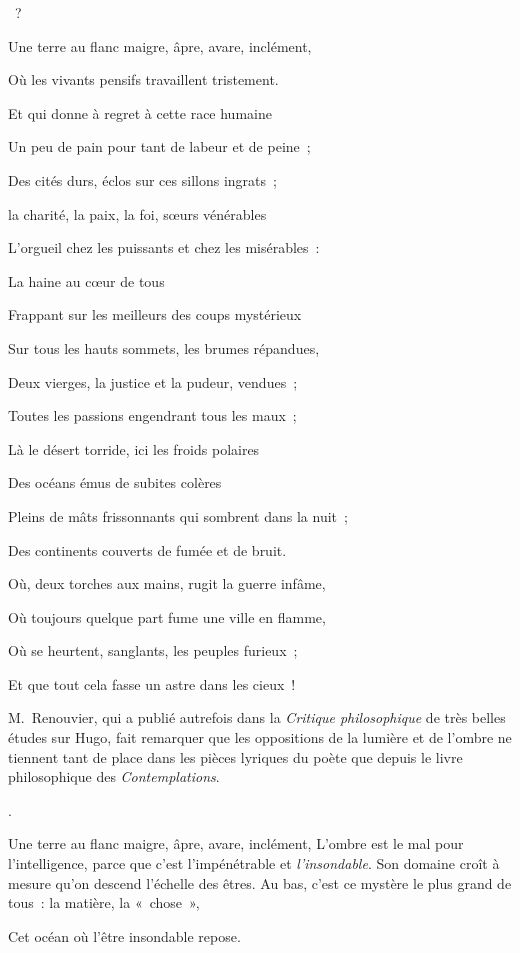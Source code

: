 \documentclass[french,twoside]{book} %
\begin{document}
{\noindent  ?\par
Une terre au flanc maigre, âpre, avare, inclément,\par
Où les vivants pensifs travaillent tristement.\par
Et qui donne à regret à cette race humaine\par
Un peu de pain pour tant de labeur et de peine ;\par
Des cités durs, éclos sur ces sillons ingrats ;\par
la charité, la paix, la foi, sœurs vénérables\par
L’orgueil chez les puissants et chez les misérables :\par
La haine au cœur de tous\par
Frappant sur les meilleurs des coups mystérieux\par
Sur tous les hauts sommets, les brumes répandues,\par
Deux vierges, la justice et la pudeur, vendues ;\par
Toutes les passions engendrant tous les maux ;\par
Là le désert torride, ici les froids polaires\par
Des océans émus de subites colères\par
Pleins de mâts frissonnants qui sombrent dans la nuit ;\par
Des continents couverts de fumée et de bruit.\par
Où, deux torches aux mains, rugit la guerre infâme,\par
Où toujours quelque part fume une ville en flamme,\par
Où se heurtent, sanglants, les peuples furieux ;\par
 Et que tout cela fasse un astre dans les cieux !
\par
\noindent M. Renouvier, qui a publié autrefois dans la \emph{Critique philosophique} de très belles études sur Hugo, fait remarquer que les oppositions de la lumière et de l’ombre ne tiennent tant de place dans les pièces lyriques du poète que depuis le livre philosophique des \emph{Contemplations}.
}.\par
Une terre au flanc maigre, âpre, avare, inclément, L’ombre est le mal pour l’intelligence, parce que c’est l’impénétrable et \emph{l’insondable}. Son domaine croît à mesure qu’on descend l’échelle des êtres. Au bas, c’est ce mystère le plus grand de tous : la matière, la « chose »,\par

Cet océan où l’être insondable repose.\\
\end{document}
